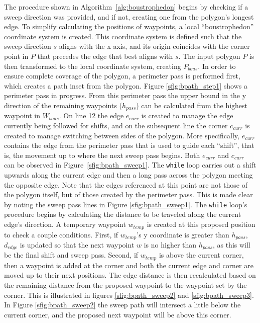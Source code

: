 The procedure shown in Algorithm~\ref{alg:boustrophedon} begins by checking if a sweep direction was provided, and if not, creating one from the polygon's longest edge.
To simplify calculating the positions of waypoints, a local ``boustrophedon'' coordinate system is created.
This coordinate system is defined such that the sweep direction $s$ aligns with the x axis, and its origin coincides with the corner point in $P$ that precedes the edge that best aligns with $s$.
The input polygon $P$ is then transformed to the local coordinate system, creating $P_{bous}$.
In order to ensure complete coverage of the polygon, a perimeter pass is performed first, which creates a path inset from the polygon.
Figure \ref{sfig:bpath_step1} shows a perimeter pass in progress.
From this perimeter pass the upper bound in the y direction of the remaining waypoints ($h_{pass}$) can be calculated from the highest waypoint in $W_{bous}$.
On line 12 the edge $e_{curr}$ is created to manage the edge currently being followed for shifts, and on the subsequent line the corner $c_{curr}$ is created to manage switching between sides of the polygon.
More specifically, $e_{curr}$ contains the edge from the perimeter pass that is used to guide each ``shift'', that is, the movement up to where the next sweep pass begins.
Both $e_{curr}$ and $c_{curr}$ can be observed in Figure~\ref{sfig:bpath_sweep1}.
The \verb|while| loop carries out a shift upwards along the current edge and then a long pass across the polygon meeting the opposite edge.
Note that the edges referenced at this point are not those of the polygon itself, but of those created by the perimeter pass.
This is made clear by noting the sweep pass lines in Figure \ref{sfig:bpath_sweep1}.
The \verb|while| loop's procedure begins by calculating the distance to be traveled along the current edge's direction.
A temporary waypoint $w_{temp}$ is created at this proposed position to check a couple conditions.
First, if $w_{temp}$'s y coordinate is greater than $h_{pass}$, $d_{edge}$ is updated so that the next waypoint $w$ is no higher than $h_{pass}$, as this will be the final shift and sweep pass.
Second, if $w_{temp}$ is above the current corner, then a waypoint is added at the corner and both the current edge and corner are moved up to their next positions.
The edge distance is then recalculated based on the remaining distance from the proposed waypoint to the waypoint set by the corner.
This is illustrated in figures \ref{sfig:bpath_sweep2} and \ref{sfig:bpath_sweep3}.
In Figure \ref{sfig:bpath_sweep2} the sweep path will intersect a little below the current corner, and the proposed next waypoint will be above this corner.
